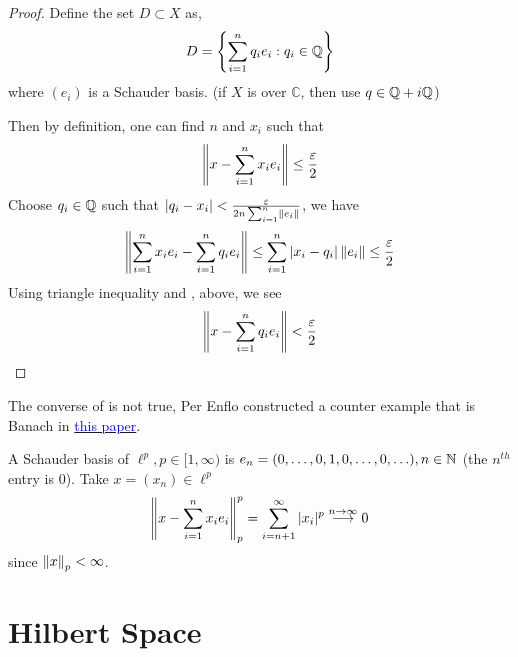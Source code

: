 \documentclass{article}
\begin{document}
\begin{proof}
	Define the set $D \subset X$ as,
	$$
		D = \left\{\sum_{i=1}^n q_i e_i: q_i \in \mathbb{Q} \right\}
	$$
	where $(e_i)$ is a Schauder basis. (if $X$ is over $\mathbb{C}$, then use $q \in \mathbb{Q} + i \mathbb{Q}$)

	Then by definition, one can find $n$ and $x_i$ such that
	\begin{equation}
		\label{3}
		\left\|{x - \sum_{i=1}^n x_i e_i}\right\| \leq \frac{\varepsilon}{2}
	\end{equation}
	Choose $q_i \in \mathbb{Q}$ such that $|q_i - x_i|<\frac{\varepsilon}{2n \sum_{i=1}^n \left\|{e_i}\right\|}$, we have
	\begin{equation}
		\label{4}
		\left\|{\sum_{i=1}^n x_i e_i - \sum_{i=1}^n q_i e_i}\right\| \leq \sum_{i=1}^n |x_i-q_i| \left\|{e_i}\right\| \leq \frac{\varepsilon}{2}
	\end{equation}
	Using triangle inequality and ,  above, we see
	$$
		\left\|{x-\sum_{i=1}^n q_i e_i}\right\| < \frac{\varepsilon}{2}
	$$
\end{proof}

\begin{remark}
	The converse of  is not true, Per Enflo constructed a counter example that is Banach in \href{https://projecteuclid.org/download/pdf_1/euclid.acta/1485889774}{\textcolor{blue}{this paper}}.
\end{remark}

\begin{example}
	A Schauder basis of $\ell^p, p\in [1, \infty)$ is $e_n=(0,\ldots, 0,1,0, \ldots,0,\ldots), n\in \mathbb{N}$ (the $n^{th}$ entry is $0$).
	Take $x=(x_n)\in \ell^p$
	$$
		\left\|{x-\sum_{i=1}^n x_ie_i}\right\|_p^p = \sum_{i=n+1}^{\infty} |x_i|^p \overset{n\to \infty}{\longrightarrow} 0
	$$
	since $\left\|{x}\right\|_p < \infty$.
\end{example}



\section{Hilbert Space}

\begin{comment}
	Hilbert space is a special class of Banach space.
	Apart from completeness and norm, it is also equipped with an additional structure,
	{\bf inner product}. This allows us to explore nice geometric properties of the space,
	like orthogonality and angle. We'll see later that this structure resemble Euclidean space in many ways. A Hilbert space is naturally Banach, while the reverse may not be true.
\end{comment}
\end{document}
